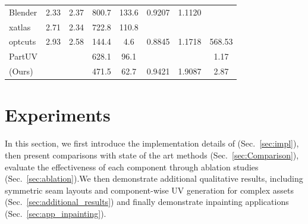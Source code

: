 \begin{table}[t]
{\begin{tabular}{l cc ccc cc}
        \\
        \midrule

        Blender 
        & 2.33  
        & 2.37 
        & 800.7  
        & 133.6 
        & 0.9207 
        & 1.1120 
        & \cellcolor{1st}{0.008} 
        
        \\
        
        xatlas 
        & 2.71 
        & 2.34 
        & 722.8  
        & 110.8  
        & \cellcolor{1st}{0.9817} 
        & \cellcolor{2nd}{1.0852} 
        & \cellcolor{2nd}{0.137}  
       
        \\
        
        optcuts 
        & 2.93  
        & 2.58 
        & 144.4  
        & 4.6  
        & 0.8845 
        & 1.1718 
        & 568.53  
        \\
        
        PartUV 
        & \cellcolor{2nd}{3.02} 
        & \cellcolor{2nd}{2.91}  
        & \cellcolor{2nd} 628.1  
        & \cellcolor{2nd} 96.1 
        & \cellcolor{2nd}{0.9749} 
        & \cellcolor{1st}{1.0843} 
        & 1.17 

        \\
        
        \methodname{} (Ours) 
        & \cellcolor{1st}{3.56} 
        & {\cellcolor{1st}{4.37}} 
        & {\cellcolor{1st} 471.5}  
        & {\cellcolor{1st}62.7}  
        & 0.9421 
        & 1.9087 
        & 2.87  
        \\
        
        \bottomrule
    \end{tabular}
    }
\end{table}


\section{Experiments}
In this section, we first introduce the implementation details of \methodname{} (Sec.~\ref{sec:impl}), then present comparisons with state of the art methods (Sec.~\ref{sec:Comparison}), evaluate the effectiveness of each component through ablation studies (Sec.~\ref{sec:ablation}).We then demonstrate additional qualitative results, including symmetric seam layouts and component-wise UV generation for complex assets (Sec.~\ref{sec:additional_results}) and finally demonstrate inpainting applications (Sec.~\ref{sec:app_inpainting}).


